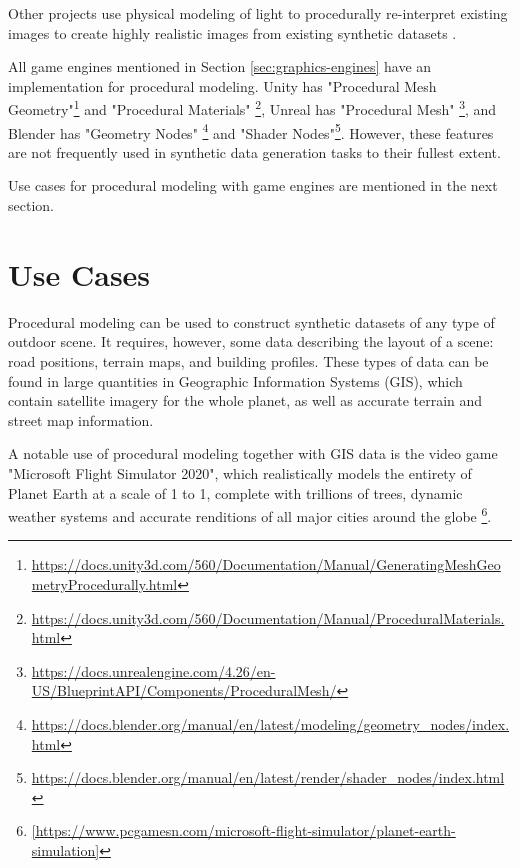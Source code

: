 Other projects use physical modeling of light to procedurally re-interpret existing images to create highly realistic images from existing synthetic datasets \cite{tsirikoglou2017procedural,wrenninge2018synscapes}.

All game engines mentioned in Section \ref{sec:graphics-engines} have an implementation for procedural modeling. Unity has "Procedural Mesh Geometry"\footnote{\url{https://docs.unity3d.com/560/Documentation/Manual/GeneratingMeshGeometryProcedurally.html}} and "Procedural Materials" \footnote{\url{https://docs.unity3d.com/560/Documentation/Manual/ProceduralMaterials.html}}, Unreal has "Procedural Mesh" \footnote{\url{https://docs.unrealengine.com/4.26/en-US/BlueprintAPI/Components/ProceduralMesh/}}, and Blender has "Geometry Nodes" \footnote{\url{https://docs.blender.org/manual/en/latest/modeling/geometry_nodes/index.html}} and "Shader Nodes"\footnote{\url{https://docs.blender.org/manual/en/latest/render/shader_nodes/index.html}}. However, these features are not frequently used in synthetic data generation tasks to their fullest extent.

Use cases for procedural modeling with game engines are mentioned in the next section.

\section{Use Cases}
\label{sec:use-cases}

Procedural modeling can be used to construct synthetic datasets of any type of outdoor scene. It requires, however, some data describing the layout of a scene: road positions, terrain maps, and building profiles. These types of data can be found in large quantities in Geographic Information Systems (GIS), which contain satellite imagery for the whole planet, as well as accurate terrain and street map information.

A notable use of procedural modeling together with GIS data is the video game "Microsoft Flight Simulator 2020", which realistically models the entirety of Planet Earth at a scale of 1 to 1, complete with trillions of trees, dynamic weather systems and accurate renditions of all major cities around the globe \footnote{\ref{https://www.pcgamesn.com/microsoft-flight-simulator/planet-earth-simulation}}.

